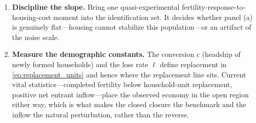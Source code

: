 \documentclass[11pt]{article}
\theoremstyle{definition}
\begin{document}
\begin{enumerate}
\item \textbf{Discipline the slope.} Bring one quasi-experimental
fertility-response-to-housing-cost moment into the identification set. It
decides whether panel (a) is genuinely flat---housing cannot stabilize this
population---or an artifact of the noise scale.
\item \textbf{Measure the demographic constants.} The conversion $c$ (headship
of newly formed households) and the loss rate $\ell$ define replacement in
\eqref{eq:replacement_units} and hence where the replacement line sits.
Current vital statistics---completed fertility below household-unit
replacement, positive net entrant inflow---place the observed economy in the
open region either way, which is what makes the closed closure the benchmark
and the inflow the natural perturbation, rather than the reverse.
\end{enumerate}
\end{document}
